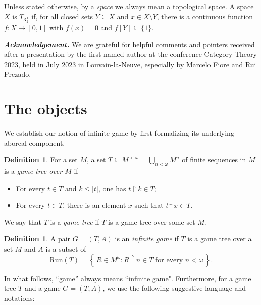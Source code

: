 \documentclass[12pt]{amsart}
\makeatletter
\newcommand*{\rom}[1]{\expandafter\@slowromancap\romannumeral #1@}
\theoremstyle{definition}
\newtheorem{defn}[thm]{Definition}
\newcommand{\set}[1]{\left\{\, {#1} \,\right\}}
\newcommand{\Run}{{\mathrm{Run}}}
\DeclareMathOperator{\restrict}{\upharpoonright}
\makeatother
\begin{document}
Unless stated otherwise, by a \textit{space} we always mean a topological space. A space $X$ is $T_{3\frac{1}{2}}$ if, for all closed sets $Y\subseteq X$ and $x\in X\setminus Y$, there is a continuous function $f\colon X\to [0,1]$ with $f(x)=0$ and $f[Y]\subseteq\{1\}$.

\medskip
{\sc \textbf{\textit{Acknowledgement.}}} We are grateful for helpful comments and pointers received after a presentation by the first-named author at the conference Category Theory 2023, held in July 2023 in Louvain-la-Neuve, especially by Marcelo Fiore and Rui Prezado.





\section{The objects}\label{SEC_Objects}
We establish our notion of infinite game by first formalizing its underlying aboreal component.


\begin{defn}\label{DEF_GameTree}
	For a set $M$, a set $T\subseteq M^{<\omega}=\bigcup_{n<\omega}{M^n}$ of finite sequences in $M$ is a \textit{game tree over $M$} if 
	\begin{itemize}
		\item[(\rom{1})] For every $t\in T$ and $k\le|t|$, one has $t\restrict k\in T$;
		\item[(\rom{2})] For every $t\in T$, there is an element $x$ such that $t^\smallfrown x\in T$.
	\end{itemize}	
	We say that $T$ is a \textit{game tree} if $T$ is a game tree over some set $M$.
\end{defn}

\begin{defn}\label{DEF_infinite_game}
	A pair $G = (T, A)$ is an \textit{infinite game} if $T$ is a game tree over a set $M$ and $A$ is a subset of 
	\[
	\Run(T) = \set{R\in M^{\omega}: R\restrict n\in T \text{ for every $n<\omega$}}.
	\]
\end{defn}


In what follows, ``game'' always means ``infinite game". Furthermore,
for a game tree $T$ and a game $G=(T,A)$, we use the following suggestive language and notations:
\end{document}
